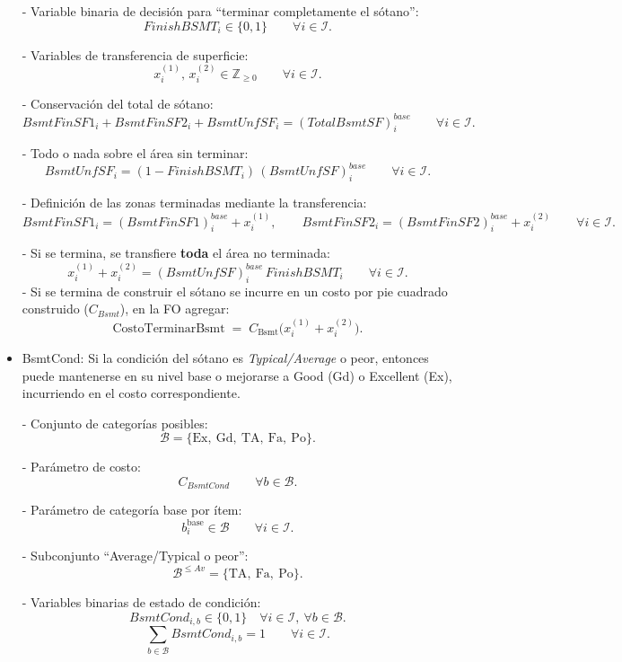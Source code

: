 \begin{itemize}
  - Variable binaria de decisión para “terminar completamente el sótano”:
  \[
    FinishBSMT_i \in \{0,1\} \qquad \forall i \in \mathcal{I}.
  \]

  - Variables de transferencia de superficie:
  \[
    x^{(1)}_{i},\, x^{(2)}_{i} \in \mathbb{Z}_{\ge 0} \qquad \forall i \in \mathcal{I}.
  \]

  - Conservación del total de sótano:
  \[
    BsmtFinSF1_i + BsmtFinSF2_i + BsmtUnfSF_i = (TotalBsmtSF)_i^{base}
    \qquad \forall i \in \mathcal{I}.
  \]

  - Todo o nada sobre el área sin terminar:
  \[
    BsmtUnfSF_i = (1 - FinishBSMT_i)\,(BsmtUnfSF)_i^{base}
    \qquad \forall i \in \mathcal{I}.
  \]

  - Definición de las zonas terminadas mediante la transferencia:
  \[
    BsmtFinSF1_i = (BsmtFinSF1)_i^{base} + x^{(1)}_i,\qquad
    BsmtFinSF2_i = (BsmtFinSF2)_i^{base} + x^{(2)}_i
    \qquad \forall i \in \mathcal{I}.
  \]

  - Si se termina, se transfiere \textbf{toda} el área no terminada:
  \[
    x^{(1)}_i + x^{(2)}_i = (BsmtUnfSF)_i^{base}\, FinishBSMT_i
    \qquad \forall i \in \mathcal{I}.
  \]
  - Si se termina de construir el sótano se incurre en un costo por pie cuadrado construido ($C_{Bsmt}$), en la FO agregar:
  \[
    \text{CostoTerminarBsmt}
    \;=\;
    C_{\text{Bsmt}}
    \Big( x^{(1)}_i + x^{(2)}_i \Big).
  \]
  

  \item BsmtCond: Si la condición del sótano es \emph{Typical/Average} o peor, entonces puede mantenerse en su nivel base o mejorarse a Good (Gd) o Excellent (Ex), incurriendo en el costo correspondiente.

  - Conjunto de categorías posibles:
\[
  \mathcal{B} = \{\text{Ex},\ \text{Gd},\ \text{TA},\ \text{Fa},\ \text{Po}\}.
\]

- Parámetro de costo:
\[
  C_{BsmtCond} \qquad \forall b \in \mathcal{B}.
\]

- Parámetro de categoría base por ítem:
\[
  b_i^{\text{base}} \in \mathcal{B} \qquad \forall i \in \mathcal{I}.
\]

- Subconjunto “Average/Typical o peor”:
\[
  \mathcal{B}^{\le Av} = \{\text{TA},\ \text{Fa},\ \text{Po}\}.
\]

- Variables binarias de estado de condición:
\[
  BsmtCond_{i,b} \in \{0,1\} \quad \forall i \in \mathcal{I},\ \forall b \in \mathcal{B}.
\]
\[
  \sum_{b \in \mathcal{B}} BsmtCond_{i,b} = 1 \qquad \forall i \in \mathcal{I}.
\]


\end{itemize}
